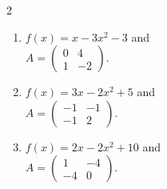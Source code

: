 \begin{multicols}{2}
\begin{enumerate}[label=\arabic*.,  leftmargin=*]
\item $f(x) = x - 3x^2 - 3$ and \\
$A = \begin{pmatrix} 0 & 4 \\ 1 & -2 \end{pmatrix}$.
\item $f(x) = 3x - 2x^2 + 5$ and \\
$A = \begin{pmatrix} -1 & -1 \\ -1 & 2 \end{pmatrix}$.
\item $f(x) = 2x - 2x^2 + 10$ and \\
$A = \begin{pmatrix} 1 & -4 \\ -4 & 0 \end{pmatrix}$.
\end{enumerate}
\end{multicols}

